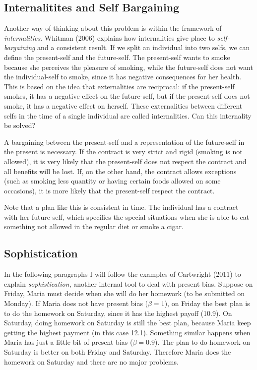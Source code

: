 \documentclass[]{article}
\begin{document}
\hypertarget{internalitites-and-self-bargaining}{%
\subsection{Internalitites and Self Bargaining}\label{internalitites-and-self-bargaining}}

Another way of thinking about this problem is within the framework of \emph{internalities}. Whitman (2006) explains how internalities give place to \emph{self-bargaining} and a consistent result.
If we split an individual into two selfs, we can define the present-self and the future-self. The present-self wants to smoke because she perceives the pleasure of smoking, while the future-self does not want the individual-self to smoke, since it has negative consequences for her health. This is based on the idea that externalities are reciprocal: if the present-self smokes, it has a negative effect on the future-self, but if the present-self does not smoke, it has a negative effect on herself. These externalities between different selfs in the time of a single individual are called internalities. Can this internality be solved?

A bargaining between the present-self and a representation of the future-self in the present is necessary. If the contract is very strict and rigid (smoking is not allowed), it is very likely that the present-self does not respect the contract and all benefits will be lost. If, on the other hand, the contract allows exceptions (such as smoking less quantity or having certain foods allowed on some occasions), it is more likely that the present-self respect the contract.

Note that a plan like this is consistent in time. The individual has a contract with her future-self, which specifies the special situations when she is able to eat something not allowed in the regular diet or smoke a cigar.

\hypertarget{sophistication}{%
\subsection{Sophistication}\label{sophistication}}

In the following paragraphs I will follow the examples of Cartwright (2011) to explain \emph{sophistication}, another internal tool to deal with present bias. Suppose on Friday, Maria must decide when she will do her homework (to be submitted on Monday). If Maria does not have present bias (\(\beta = 1\)), on Friday the best plan is to do the homework on Saturday, since it has the highest payoff (10.9). On Saturday, doing homework on Saturday is still the best plan, because Maria keep getting the highest payment (in this case 12.1). Something similar happens when Maria has just a little bit of present bias (\(\beta = 0.9\)). The plan to do homework on Saturday is better on both Friday and Saturday. Therefore Maria does the homework on Saturday and there are no major problems.
\end{document}
